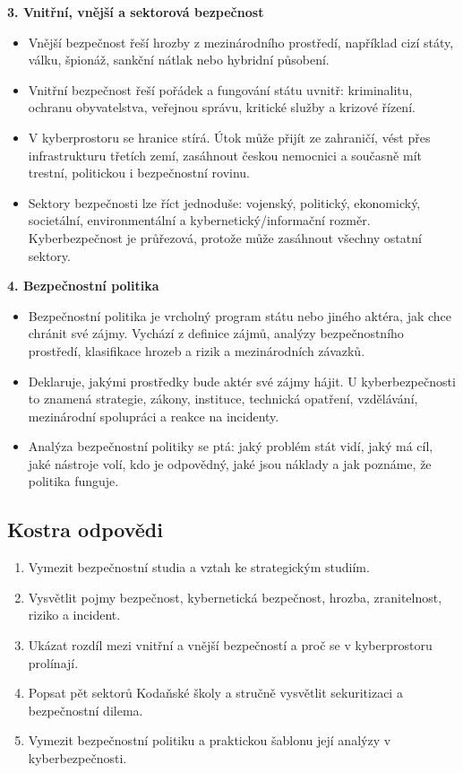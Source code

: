 \textbf{3. Vnitřní, vnější a sektorová bezpečnost}
\begin{itemize}
  \item Vnější bezpečnost řeší hrozby z mezinárodního prostředí, například cizí státy, válku, špionáž, sankční nátlak nebo hybridní působení.
  \item Vnitřní bezpečnost řeší pořádek a fungování státu uvnitř: kriminalitu, ochranu obyvatelstva, veřejnou správu, kritické služby a krizové řízení.
  \item V kyberprostoru se hranice stírá. Útok může přijít ze zahraničí, vést přes infrastrukturu třetích zemí, zasáhnout českou nemocnici a současně mít trestní, politickou i bezpečnostní rovinu.
  \item Sektory bezpečnosti lze říct jednoduše: vojenský, politický, ekonomický, societální, environmentální a kybernetický/informační rozměr. Kyberbezpečnost je průřezová, protože může zasáhnout všechny ostatní sektory.
\end{itemize}

\textbf{4. Bezpečnostní politika}
\begin{itemize}
  \item Bezpečnostní politika je vrcholný program státu nebo jiného aktéra, jak chce chránit své zájmy. Vychází z definice zájmů, analýzy bezpečnostního prostředí, klasifikace hrozeb a rizik a mezinárodních závazků.
  \item Deklaruje, jakými prostředky bude aktér své zájmy hájit. U kyberbezpečnosti to znamená strategie, zákony, instituce, technická opatření, vzdělávání, mezinárodní spolupráci a reakce na incidenty.
  \item Analýza bezpečnostní politiky se ptá: jaký problém stát vidí, jaký má cíl, jaké nástroje volí, kdo je odpovědný, jaké jsou náklady a jak poznáme, že politika funguje.
\end{itemize}

\subsection*{Kostra odpovědi}
\begin{enumerate}
  \item Vymezit bezpečnostní studia a vztah ke strategickým studiím.
  \item Vysvětlit pojmy bezpečnost, kybernetická bezpečnost, hrozba, zranitelnost, riziko a incident.
  \item Ukázat rozdíl mezi vnitřní a vnější bezpečností a proč se v kyberprostoru prolínají.
  \item Popsat pět sektorů Kodaňské školy a stručně vysvětlit sekuritizaci a bezpečnostní dilema.
  \item Vymezit bezpečnostní politiku a praktickou šablonu její analýzy v kyberbezpečnosti.
\end{enumerate}

